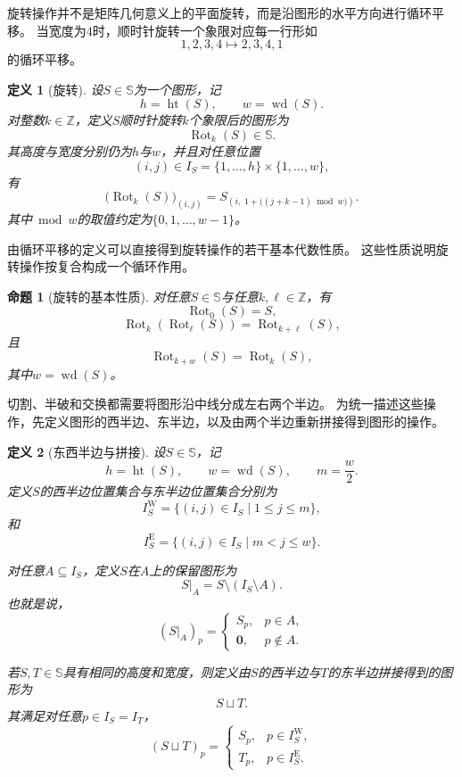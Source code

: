 \documentclass[UTF8,fontset=none]{ctexart}
\theoremstyle{cnthm}
\newtheorem{definition}{定义}[section]
\newtheorem{proposition}{命题}[section]
\begin{document}
			旋转操作并不是矩阵几何意义上的平面旋转，而是沿图形的水平方向进行循环平移。
			当宽度为$4$时，顺时针旋转一个象限对应每一行形如
			$$
			1,2,3,4\mapsto 2,3,4,1
			$$
			的循环平移。
			
			\begin{definition}[旋转]
				设$S\in\mathbb{S}$为一个图形，记
				$$
				h=\operatorname{ht}(S),
				\qquad
				w=\operatorname{wd}(S).
				$$
				对整数$k\in\mathbb{Z}$，定义$S$顺时针旋转$k$个象限后的图形为
				$$
				\operatorname{Rot}_k(S)\in\mathbb{S}.
				$$
				其高度与宽度分别仍为$h$与$w$，并且对任意位置
				$$
				(i,j)\in I_S=\{1,\dots,h\}\times\{1,\dots,w\},
				$$
				有
				$$
				\bigl(\operatorname{Rot}_k(S)\bigr)_{(i,j)}
				=
				S_{\left(i,\;1+\bigl((j+k-1)\bmod w\bigr)\right)}.
				$$
				其中$\bmod w$的取值约定为$\{0,1,\dots,w-1\}$。
			\end{definition}
			
			由循环平移的定义可以直接得到旋转操作的若干基本代数性质。
			这些性质说明旋转操作按复合构成一个循环作用。
			
			\begin{proposition}[旋转的基本性质]
				对任意$S\in\mathbb{S}$与任意$k,\ell\in\mathbb{Z}$，有
				$$
				\operatorname{Rot}_0(S)=S,
				$$
				$$
				\operatorname{Rot}_k(\operatorname{Rot}_\ell(S))
				=
				\operatorname{Rot}_{k+\ell}(S),
				$$
				且
				$$
				\operatorname{Rot}_{k+w}(S)=\operatorname{Rot}_k(S),
				$$
				其中$w=\operatorname{wd}(S)$。
			\end{proposition}
			
			切割、半破和交换都需要将图形沿中线分成左右两个半边。
			为统一描述这些操作，先定义图形的西半边、东半边，以及由两个半边重新拼接得到图形的操作。
			
			\begin{definition}[东西半边与拼接]
				设$S\in\mathbb{S}$，记
				$$
				h=\operatorname{ht}(S),
				\qquad
				w=\operatorname{wd}(S),
				\qquad
				m=\frac{w}{2}.
				$$
				定义$S$的西半边位置集合与东半边位置集合分别为
				$$
				I^{\mathrm W}_S
				=
				\{(i,j)\in I_S\mid 1\leq j\leq m\},
				$$
				和
				$$
				I^{\mathrm E}_S
				=
				\{(i,j)\in I_S\mid m<j\leq w\}.
				$$
				
				对任意$A\subseteq I_S$，定义$S$在$A$上的保留图形为
				$$
				S|_A
				=
				S\setminus (I_S\setminus A).
				$$
				也就是说，
				$$
				(S|_A)_p
				=
				\begin{cases}
					S_p, & p\in A,\\
					\mathbf{0}, & p\notin A.
				\end{cases}
				$$
				
				若$S,T\in\mathbb{S}$具有相同的高度和宽度，则定义由$S$的西半边与$T$的东半边拼接得到的图形为
				$$
				S\sqcup T.
				$$
				其满足对任意$p\in I_S=I_T$，
				$$
				(S\sqcup T)_p
				=
				\begin{cases}
					S_p, & p\in I^{\mathrm W}_S,\\
					T_p, & p\in I^{\mathrm E}_S.
				\end{cases}
				$$
			\end{definition}
			
\end{document}
